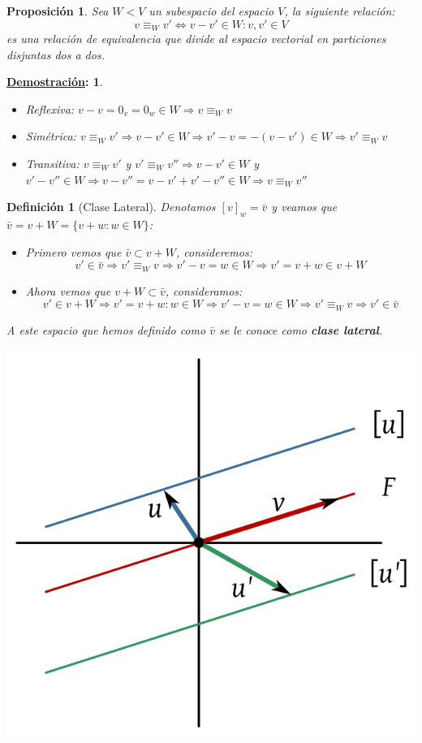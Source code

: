 \documentclass[10pt,a4paper,openright]{book}
\theoremstyle{break}
\newtheorem*{defi}{Definición}
\newtheorem*{prop}{Proposición}
\newtheorem*{demo}{\underline{Demostración}:}
\begin{document}
\begin{prop}
Sea $W<V$ un subespacio del espacio $V$, la siguiente relación:
$$v\equiv_W v' \Leftrightarrow v-v'\in W: v,v'\in V$$
es una relación de equivalencia que divide al espacio vectorial en particiones disjuntas dos a dos.
\end{prop}
\begin{demo}
\begin{itemize}
\item Reflexiva: $v-v=0_v=0_w\in W\Rightarrow v\equiv_W v$
\item Simétrica: $v\equiv_W v'\Rightarrow v-v'\in W\Rightarrow v'-v=-(v-v')\in W\Rightarrow v'\equiv_W v$
\item Transitiva: $v\equiv_W v'$ y $v'\equiv_W v''\Rightarrow v-v'\in W$ y $v'-v''\in W\Rightarrow v-v''=v-v'+v'-v''\in W\Rightarrow v\equiv_W v''$
\end{itemize}
\end{demo}
\begin{defi}[Clase Lateral]
Denotamos $[v]_w=\bar{v}$ y veamos que $\bar{v}=v+W=\{v+w: w\in W\}$:
\begin{itemize}
\item Primero vemos que $\bar{v}\subset v+W$, consideremos:
$$v'\in\bar{v}\Rightarrow v'\equiv_W v\Rightarrow v'-v=w\in W\Rightarrow v'=v+w\in v+ W$$

\item Ahora vemos que $v+W\subset \bar{v}$, consideramos:
$$v'\in v+W\Rightarrow v'=v+w : w\in W\Rightarrow v'-v=w\in W\Rightarrow v'\equiv_W v\Rightarrow v'\in \bar{v}$$
\end{itemize}

A este espacio que hemos definido como $\bar{v}$ se le conoce como \textbf{clase lateral}.
\begin{center}
\includegraphics[scale=0.25]{clase lateral}
\end{center}
\end{defi}
\end{document}
